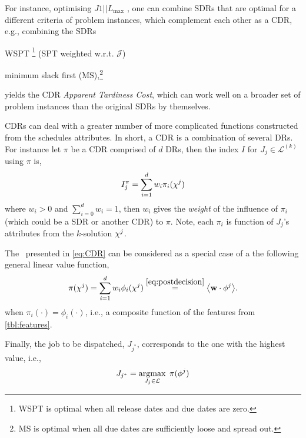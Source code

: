 For instance, optimising $J1||L_{\max}$ \cite[see. chapter 14.2]{Pinedo08}, one 
can combine SDRs that are optimal for a different criteria of problem 
instances, which complement each other as a CDR, e.g., combining the SDRs 
\begin{enumerate*}[after={{}}]
    \item WSPT \footnote{WSPT is optimal when all release dates and due dates 
        are zero.} (SPT weighted w.r.t. $\mathcal{J}$)
    \item minimum slack first (MS),\footnote{MS is optimal when all due dates 
        are sufficiently loose and spread out.} 
\end{enumerate*}
yields the CDR \emph{Apparent Tardiness Cost}, which can work well on a 
broader set of problem instances than the original SDRs by themselves.


CDRs can deal with a greater number of more complicated functions constructed 
from the schedules attributes. In short, a CDR is a combination of several DRs. 
For instance let $\pi$ be a CDR comprised of $d$ DRs, then the index $I$ for 
$J_j\in\mathcal{L}^{(k)}$ using $\pi$ is, 
\begin{equation}\label{eq:CDR}
I_j^{\pi} = \sum_{i=1}^d w_i \pi_i(\vchi^j) 
\end{equation}
where $w_i>0$ and $\sum_{i=0}^d w_i = 1$, then $w_i$ gives the \emph{weight} of 
the influence of $\pi_i$ (which could be a SDR or another CDR) to $\pi$. Note, 
each $\pi_i$ is function of $J_j$'s attributes from the $k$-solution ${\mathbf{\chi}}^j$.

The \cdr\ presented in \cref{eq:CDR} can be considered as a special case of a 
the following general linear value function,
\begin{equation}\label{eq:CDR:feat}
\pi(\vchi^j) = \sum_{i=1}^d w_i \phi_i(\vchi^j)
\stackrel{\eqref{eq:postdecision}}{=} \inner{\vec{w}}{\vphi^j}.
\end{equation}
when $\pi_i(\cdot)=\phi_i(\cdot)$, i.e., a composite function of the features 
from \cref{tbl:features}. 

Finally, the job to be dispatched, $J_{j^*}$, corresponds to the one with the 
highest value, i.e.,
\begin{equation}\label{eq:jstar}
J_{j^*}=\argmax_{J_j\in \mathcal{L}}\; \pi(\vphi^j)
\end{equation}


